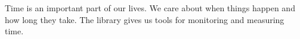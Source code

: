\chapter{}\label{ch:chrono}

Time is an important part of our lives.
We care about when things happen and how long they take.
The  library gives us tools for monitoring and measuring time.


